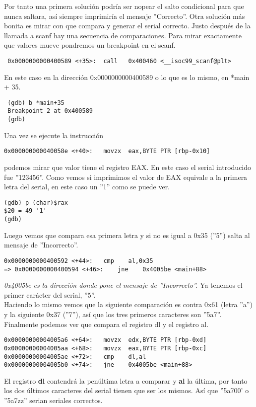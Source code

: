 Por tanto una primera solución podría ser nopear el salto condicional para que nunca saltara, así siempre imprimiría el mensaje ''Correcto''. Otra solución más bonita es mirar con que compara y generar el serial correcto.
Justo después de la llamada a scanf hay una secuencia de comparaciones. Para mirar exactamente que valores mueve pondremos un breakpoint en el scanf.
\begin{verbatim}
 0x0000000000400589 <+35>:	call   0x400460 <__isoc99_scanf@plt>
\end{verbatim}
En este caso en la dirección 0x0000000000400589 o lo que es lo mismo, en *main + 35.
\begin{verbatim}
 (gdb) b *main+35
 Breakpoint 2 at 0x400589
 (gdb) 
\end{verbatim}
Una vez se ejecute la instrucción
\begin{verbatim}
0x000000000040058e <+40>:	movzx  eax,BYTE PTR [rbp-0x10]
\end{verbatim}
podemos mirar que valor tiene el registro EAX. En este caso el serial introducido fue ''123456''. Como vemos si imprimimos el valor de EAX equivale a la primera letra del serial, en este caso un ''1'' como se puede ver.
\begin{verbatim}
(gdb) p (char)$rax
$20 = 49 '1'
(gdb)
\end{verbatim}
Luego vemos que compara esa primera letra y si no es igual a 0x35 (''5'') salta al mensaje de ''Incorrecto''.
\begin{verbatim}
0x0000000000400592 <+44>:	cmp    al,0x35
=> 0x0000000000400594 <+46>:	jne    0x4005be <main+88>
\end{verbatim}
\emph{0x4005be es la dirección donde pone el mensaje de ''Incorrecto''.} 
Ya tenemos el primer carácter del serial, ''5''. \\
Haciendo lo mismo vemos que la siguiente comparación es contra 0x61 (letra ''a'') y la siguiente 0x37 (''7''), así que los tres primeros caracteres son ''5a7''. 
Finalmente podemos ver que compara el registro dl y el registro al. 
\begin{verbatim}
0x00000000004005a6 <+64>:	movzx  edx,BYTE PTR [rbp-0xd]
0x00000000004005aa <+68>:	movzx  eax,BYTE PTR [rbp-0xc]
0x00000000004005ae <+72>:	cmp    dl,al
0x00000000004005b0 <+74>:	jne    0x4005be <main+88>
\end{verbatim} 
El registro \textbf{dl} contendrá la penúltima letra a comparar y \textbf{al} la última, por tanto los dos últimos caracteres del serial tienen que ser los mismos. Así que ''5a700' o ''5a7zz'' serian seriales correctos.


